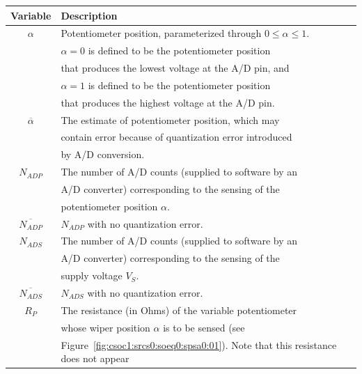 \begin{table}
\begin{center}
\begin{tabular}{|c|l|}
\hline
Variable           & Description \\
\hline
\hline
$\alpha$           & Potentiometer position, parameterized through $0\leq\alpha\leq 1$. \\
                   & $\alpha=0$ is defined to be the potentiometer position \\
                   & that produces the lowest voltage at the A/D pin, and \\
                   & $\alpha=1$ is defined to be the potentiometer position \\
                   & that produces the highest voltage at the A/D pin.    \\
\hline
$\overline{\alpha}$     
                   & The estimate of potentiometer position, which may    \\
                   & contain error because of quantization error introduced \\
                   & by A/D conversion.                                   \\
\hline
$N_{ADP}$          & The number of A/D counts (supplied to software by an \\
                   & A/D converter) corresponding to the sensing of the   \\
                   & potentiometer position $\alpha$.                     \\
\hline
$\overline{N_{ADP}}$          
                   & $N_{ADP}$ with no quantization error.                \\
\hline
$N_{ADS}$          & The number of A/D counts (supplied to software by an \\
                   & A/D converter) corresponding to the sensing of the   \\
                   & supply voltage $V_S$.                                \\
\hline
$\overline{N_{ADS}}$          
                   & $N_{ADS}$ with no quantization error.                \\
\hline
$R_P$              & The resistance (in Ohms) of the variable potentiometer \\
                   & whose wiper position $\alpha$ is to be sensed (see   \\
                   & Figure~\ref{fig:csoc1:srcs0:soeq0:spsa0:01}).  Note that this resistance does not appear \\

\end{tabular}
\end{center}
\end{table}
